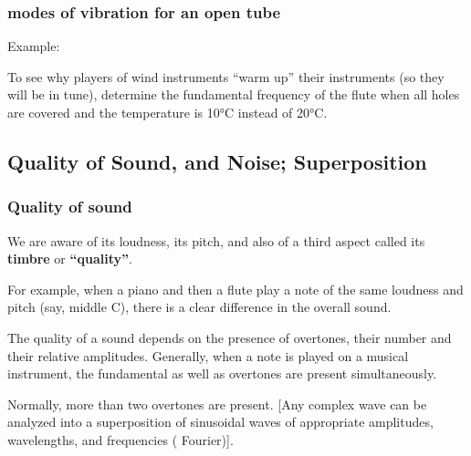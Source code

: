 \documentclass[]{beamer}
\begin{document}
\begin{frame}
\frametitle{modes of vibration for an open tube}

Example:
\vspace{3mm}


To see why players of wind instruments “warm up” their instruments (so they
will be in tune), determine the fundamental frequency of the flute  when
all holes are covered and the temperature is 10°C instead of 20°C.


  \end{frame}




\subsection{Quality of Sound, and Noise;
Superposition}

\begin{frame}
\frametitle{Quality of sound}

We are aware of its loudness, its pitch, and also of a third aspect called its \textbf{timbre} or\textbf{ “quality”}.

\pause
\vspace{3mm}

For example, when a piano and then a flute play a note of the same loudness and pitch (say,
middle C), there is a clear difference in the overall sound. 

\pause
\vspace{3mm}

The quality of a sound depends on the presence of overtones, their
number and their relative amplitudes. Generally, when a note is played on a musical
instrument, the fundamental as well as overtones are present simultaneously.
\pause
\vspace{3mm}


Normally, more than two overtones are present. [Any complex wave can be analyzed
into a superposition of sinusoidal waves of appropriate amplitudes, wavelengths, and
frequencies ( Fourier)].


  \end{frame}






\end{document}
